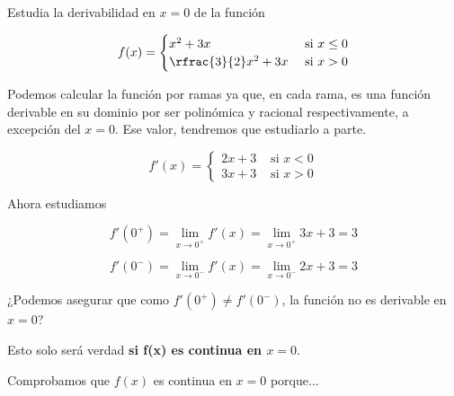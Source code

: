 \begin{problem} Estudia la derivabilidad en $x=0$ de la función 

\[f(x) = \begin{cases} x^2+3x & \text{ si } x\leq 0\\ \rfrac{3}{2}x^2+3x&\text{ si } x>0\end{cases}\]
\solution



Podemos calcular la función por ramas ya que, en cada rama, es una función derivable en su dominio por ser polinómica y racional respectivamente, a excepción del $x=0$. Ese valor, tendremos que estudiarlo a parte.

\[f'(x) = \begin{cases} 2x+3 & \text{ si } x< 0\\ 3x+3 &\text{ si } x>0\end{cases}\]

Ahora estudiamos 

$$f'(0^+) = \lim_{x\to 0^+} f'(x) = \lim_{x\to 0^+} 3x+3 = 3$$


$$f'(0^-) = \lim_{x\to 0^-} f'(x) = \lim_{x\to 0^-} 2x+3 = 3$$


¿Podemos asegurar que como $f'(0^+) \neq f'(0^-)$, la función no es derivable en $x=0$?

Esto solo será verdad \textbf{si f(x) es continua en $x=0$}.

Comprobamos que $f(x)$ es continua en $x=0$ porque...

\end{problem}







